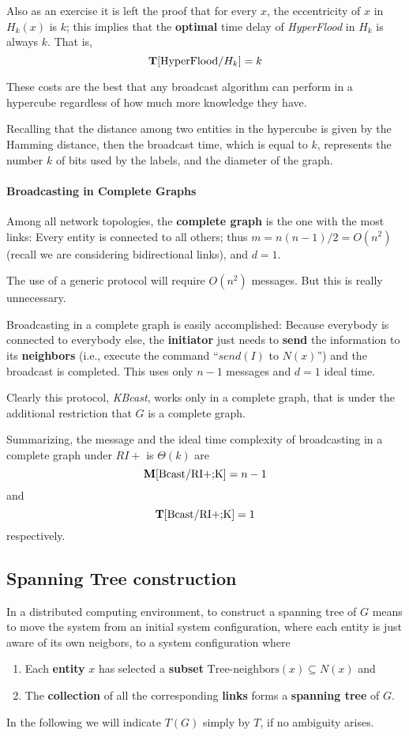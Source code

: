
Also as an exercise it is left the proof that for every $x$, the eccentricity of $x$ in $H_k(x)$ is $k$; this implies that the \textbf{optimal} time delay of \textit{HyperFlood} in $H_k$ is always $k$. That is,
$$\mathbf{T}[\text{HyperFlood/$H_k$}] = k$$ 

These costs are the best that any broadcast algorithm can perform in a hypercube regardless of how much more knowledge they have.

Recalling that the distance among two entities in the hypercube is given by the Hamming distance, then the broadcast time, which is equal to $k$, represents the number $k$ of bits used by the labels, and the diameter of the graph.

\paragraph{Broadcasting in Complete Graphs} Among all network topologies, the \textbf{complete graph} is the one with the most links: Every entity is connected to all others; thus $m = n(n - 1)/2 = O(n^2)$ (recall we are considering bidirectional links), and $d = 1$. 

The use of a generic protocol will require $O(n^2)$ messages. But this is really unnecessary. 

Broadcasting in a complete graph is easily accomplished: Because everybody is connected to everybody else, the \textbf{initiator} just needs to \textbf{send} the information to its \textbf{neighbors} (i.e., execute the command “$send(I)$ to $N(x)$”) and the broadcast is completed. This uses only $n - 1$ messages and $d = 1$ ideal time. 

Clearly this protocol, \textit{KBcast}, works only in a complete graph, that is under the additional restriction that $G$ is a complete graph.

Summarizing, the message and the ideal time complexity of broadcasting in a complete graph under $RI+$ is $\Theta(k)$ are $$\mathbf{M}[\text{Bcast/RI+;K}] = n - 1$$ and $$\mathbf{T}[\text{Bcast/RI+;K}] = 1$$ respectively.

\subsection{Spanning Tree construction}
In a distributed computing environment, to construct a spanning tree of $G$ means to move the system from an initial system configuration, where each entity is just aware of its own neigbors, to a system configuration where
\begin{enumerate}
    \item Each \textbf{entity} $x$ has selected a \textbf{subset} $\text{Tree-neighbors}(x) \subseteq N(x)$ and
    \item The \textbf{collection} of all the corresponding \textbf{links} forms a \textbf{spanning tree} of $G$.
\end{enumerate}
In the following we will indicate $T(G)$ simply by $T$, if no ambiguity arises. 

